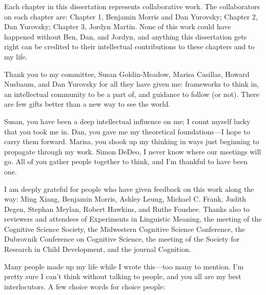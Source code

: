 \documentclass{ucetd}
\date{August 2023}
\title{\thesistitle}
\author{\thesisauthor}
\begin{document}
\maketitle

\makecopyright


\tableofcontents
{}
\newpage
{}
\listoffigures
\newpage
{}
\listoftables
\newpage

\acknowledgments
Each chapter in this dissertation represents collaborative work. The collaborators on each chapter are: Chapter 1, Benjamin Morris and Dan Yurovsky; Chapter 2, Dan Yurovsky; Chapter 3, Jordyn Martin. None of this work could have happened without Ben, Dan, and Jordyn, and anything this dissertation gets right can be credited to their intellectual contributions to these chapters and to my life.

Thank you to my committee, Susan Goldin-Meadow, Marisa Casillas, Howard Nusbaum, and Dan Yurovsky for all they have given me: frameworks to think in, an intellectual community to be a part of, and guidance to follow (or not). There are few gifts better than a new way to see the world.

Susan, you have been a deep intellectual influence on me; I count myself lucky that you took me in. Dan, you gave me my theoretical foundations—I hope to carry them forward. Marisa, you shook up my thinking in ways just beginning to propagate through my work. Simon DeDeo, I never know where our meetings will go. All of you gather people together to think, and I'm thankful to have been one.

I am deeply grateful for people who have given feedback on this work along the way: Ming Xiang, Benjamin Morris, Ashley Leung, Michael C. Frank, Judith Degen, Stephan Meylan, Robert Hawkins, and Ruthe Foushee. Thanks also to reviewers and attendees of Experiments in Linguistic Meaning, the meeting of the Cognitive Science Society, the Midwestern Cognitive Science Conference, the Dubrovnik Conference on Cognitive Science, the meeting of the Society for Research in Child Development, and the journal Cognition.

Many people made up my life while I wrote this—too many to mention. I'm pretty sure I can't think without talking to people, and you all are my best interlocutors. A few choice words for choice people:
\end{document}
